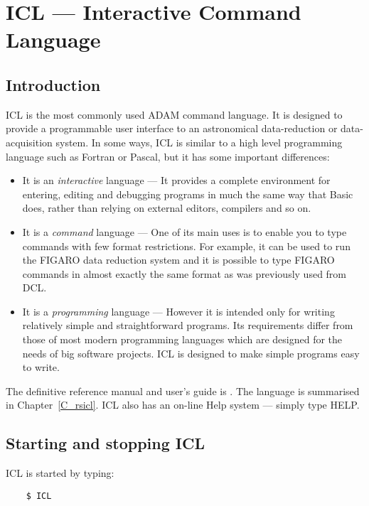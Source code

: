 \chapter{ICL --- Interactive Command Language}
\label{C_ugicl}

\section {Introduction}
\label{S_iclint}

ICL is the most commonly used ADAM command language.
It is designed to provide a programmable user interface to an astronomical
data-reduction or data-acquisition system.
In some ways, ICL is similar to a high level programming language such as
Fortran or Pascal, but it has some important differences:
\begin{itemize}
\item It is an {\em interactive\/} language ---
 It provides a complete environment for entering, editing and debugging
 programs in much the same way that Basic does, rather than relying on external
 editors, compilers and so on. 
\item It is a {\em command\/} language ---
 One of its main uses is to enable you to type commands with few format
 restrictions.
 For example, it can be used to run the FIGARO data reduction system and it is
 possible to type FIGARO commands in almost exactly the same format as was
 previously used from DCL.
\item It is a {\em programming} language ---
 However it is intended only for writing relatively simple and straightforward
 programs.
 Its requirements differ from those of most modern programming languages which
 are designed for the needs of big software projects.
 ICL is designed to make simple programs easy to write.
\end{itemize}

The definitive reference manual and user's guide is .
The language is summarised in Chapter~\ref{C_rsicl}.
ICL also has an on-line Help system --- simply type HELP.

\section {Starting and stopping ICL}
\label{S_useicl}

ICL is started by typing:

\begin{small}
\begin{verbatim}
    $ ICL
\end{verbatim}
\end{small}

